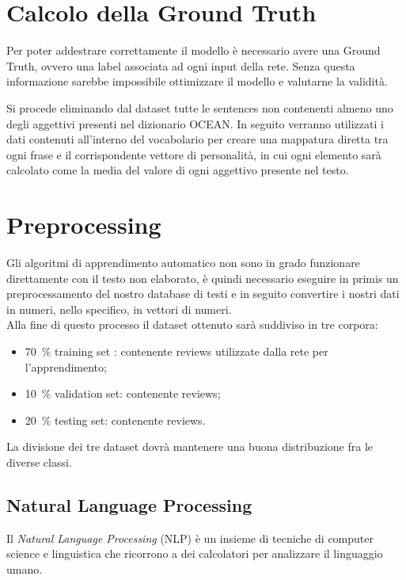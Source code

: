 \section{Calcolo della Ground Truth}
\label{sec:GroundTruth}

Per poter addestrare correttamente il modello è necessario avere una Ground Truth, ovvero una label associata ad ogni input della rete. Senza questa informazione sarebbe impossibile ottimizzare il modello e valutarne la validità. 

Si procede eliminando dal dataset tutte le sentences non contenenti almeno uno degli aggettivi presenti nel dizionario OCEAN. In seguito verranno utilizzati i dati contenuti all'interno del vocabolario per creare una mappatura diretta tra ogni frase e il corrispondente vettore di personalità, in cui ogni elemento sarà calcolato come la media del valore di ogni aggettivo presente nel testo.

\section{Preprocessing}
\label{sec:preprocessing}
Gli algoritmi di apprendimento automatico non sono in grado funzionare direttamente con il testo non elaborato, è quindi necessario eseguire in primis un preprocessamento del nostro database di testi e in seguito convertire i nostri dati in numeri, nello specifico, in vettori di numeri.\\
Alla fine di questo processo il dataset ottenuto sarà suddiviso in tre corpora: 
\begin{itemize}
	\item \SI{70}{\percent} training set : contenente  reviews utilizzate dalla rete per l'apprendimento;
	\item \SI{10}{\percent} validation set: contenente  reviews;
	\item \SI{20}{\percent} testing set: contenente  reviews.
\end{itemize}
La divisione dei tre dataset dovrà mantenere una buona distribuzione fra le diverse classi.

\subsection{Natural Language Processing}
\label{subsec:nlp}
Il \emph{Natural Language Processing} (NLP) è un insieme di tecniche di computer science e linguistica che ricorrono a dei calcolatori per analizzare il linguaggio umano.
\\

